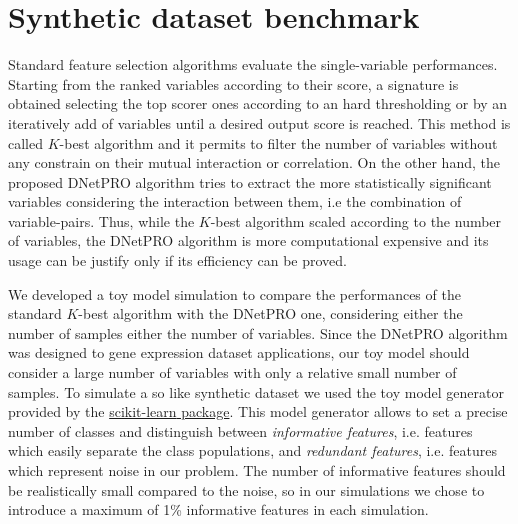 \documentclass{standalone}
\begin{document}
\section[Toy Model]{Synthetic dataset benchmark}\label{dnetpro:toy}

Standard feature selection algorithms evaluate the single-variable performances.
Starting from the ranked variables according to their score, a signature is obtained selecting the top scorer ones according to an hard thresholding or by an iteratively add of variables until a desired output score is reached.
This method is called $K$-best algorithm and it permits to filter the number of variables without any constrain on their mutual interaction or correlation.
On the other hand, the proposed \textsf{DNetPRO} algorithm tries to extract the more statistically significant variables considering the interaction between them, i.e the combination of variable-pairs.
Thus, while the $K$-best algorithm scaled according to the number of variables, the \textsf{DNetPRO} algorithm is more computational expensive and its usage can be justify only if its efficiency can be proved.

We developed a toy model simulation to compare the performances of the standard $K$-best algorithm with the \textsf{DNetPRO} one, considering either the number of samples either the number of variables.
Since the \textsf{DNetPRO} algorithm was designed to gene expression dataset applications, our toy model should consider a large number of variables with only a relative small number of samples.
To simulate a so like synthetic dataset we used the toy model generator provided by the \href{https://scikit-learn.org/stable/modules/generated/sklearn.datasets.make_classification.html}{\textsf{scikit-learn} package}.
This model generator allows to set a precise number of classes and distinguish between \emph{informative features}, i.e. features which easily separate the class populations, and \emph{redundant features}, i.e. features which represent noise in our problem.
The number of informative features should be realistically small compared to the noise, so in our simulations we chose to introduce a maximum of 1\% informative features in each simulation.
\end{document}
